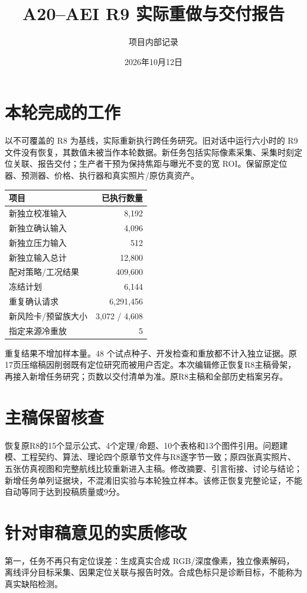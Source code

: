 \documentclass[UTF8,a4paper,11pt,fontset=fandol]{ctexart}
\title{A20--AEI R9 实际重做与交付报告}
\author{项目内部记录}\date{2026年10月12日}
\begin{document}
\maketitle
\section{本轮完成的工作}
以不可覆盖的 R8 为基线，实际重新执行跨任务研究。旧对话中运行六小时的 R9 文件没有恢复，其数值未被当作本轮数据。新任务包括实际像素采集、采集时刻定位关联、报告交付；生产者干预为保持焦距与曝光不变的宽 ROI。保留原定位器、预测器、价格、执行器和真实照片/原仿真资产。

\begin{center}\begin{tabular}{lr}\toprule
项目 & 已执行数量\\\midrule
新独立校准输入 &8,192\\
新独立确认输入 &4,096\\
新独立压力输入 &512\\
新独立输入总计 &12,800\\
配对策略/工况结果 &409,600\\
冻结计划 &6,144\\
重复确认请求 &6,291,456\\
新风险卡/预留族大小 &3,072 / 4,608\\
指定来源冷重放 &5\\\bottomrule\end{tabular}\end{center}
重复结果不增加样本量。48 个试点种子、开发检查和重放都不计入独立证据。原17页压缩稿因削弱既有定位研究而被用户否定。本次编辑修正恢复R8主稿骨架，再接入新增任务研究；页数以交付清单为准。原R8主稿和全部历史档案另存。

\section{主稿保留核查}
恢复原R8的15个显示公式、4个定理/命题、10个表格和13个图件引用。问题建模、工程契约、算法、理论四个原章节文件与R8逐字节一致；原四张真实照片、五张仿真视图和完整航线比较重新进入主稿。修改摘要、引言衔接、讨论与结论；新增任务单列证据块，不混淆旧实验与本轮独立样本。该修正恢复完整论证，不能自动等同于达到投稿质量或9分。

\section{针对审稿意见的实质修改}
第一，任务不再只有定位误差：生成真实合成 RGB/深度像素，独立像素解码，离线评分目标采集、因果定位关联与报告时效。合成色标只是诊断目标，不能称为真实缺陷检测。
\end{document}
